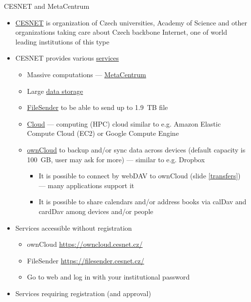 \documentclass[compress, ucs, xelatex, 11pt, xcolor=svgnames, aspectratio=169,
	hyperref={
		bookmarks=true,
		unicode=true,
		colorlinks=true,
		pdftitle={Linux, command line and MetaCentrum},
		plainpages=false,
		pdfauthor={Vojtech Zeisek},
		pdfsubject={Course about use of Linux command line, writing shell scripts and using MetaCentrum of CESNET},
		pdfcreator={XeLaTeX},
		pdfkeywords={Linux, GNU, BASH, shell, command line, MetaCentrum},
		linkcolor=DarkRed, %
		anchorcolor=DarkBlue, %
		citecolor=Indigo, %
		filecolor=NavyBlue, %
		menucolor=DarkMagenta, %
		urlcolor=DarkBlue, %
		pdftex},
	url={hyphens, lowtilde} %
	]{beamer}
\begin{document}
\begin{frame}[allowframebreaks]{CESNET and MetaCentrum}
	\label{CESNET}
	\begin{itemize}
		\item \href{https://www.cesnet.cz/?lang=en}{CESNET} is organization of Czech universities, Academy of Science and other organizations taking care about Czech backbone Internet, one of world leading institutions of this type
		\item CESNET provides various \href{https://www.cesnet.cz/services/?lang=en}{services}
		\begin{itemize}
			\item Massive computations --- \href{https://www.cesnet.cz/services/massive-computations-metacentrum/?lang=en}{MetaCentrum}
			\item Large \href{https://www.cesnet.cz/services/data-storage/?lang=en}{data storage}
			\item \href{https://www.cesnet.cz/services/filesender/?lang=en}{FileSender} to be able to send up to 1.9~TB file
			\item \href{https://www.metacentrum.cz/en/Sluzby/Cloud/}{Cloud} --- computing (HPC) cloud similar to e.g. Amazon Elastic Compute Cloud (EC2) or Google Compute Engine
			\item \href{https://www.cesnet.cz/services/owncloud/?lang=en}{ownCloud} to backup and/or sync data across devices (default capacity is 100~GB, user may ask for more) --- similar to e.g. Dropbox
			\begin{itemize}
				\item It is possible to connect by webDAV to ownCloud (slide \ref{transfers}) --- many applications support it
				\item It is possible to share calendars and/or address books via calDav and cardDav among devices and/or people
			\end{itemize}
		\end{itemize}
		\item Services accessible without registration
		\begin{itemize}
			\item ownCloud \url{https://owncloud.cesnet.cz/}
			\item FileSender \url{https://filesender.cesnet.cz/}
			\item Go to web and log in with your institutional password
		\end{itemize}
		\item Services requiring registration (and approval)
		\begin{itemize}

\end{itemize}
\end{itemize}
\end{frame}
\end{document}

